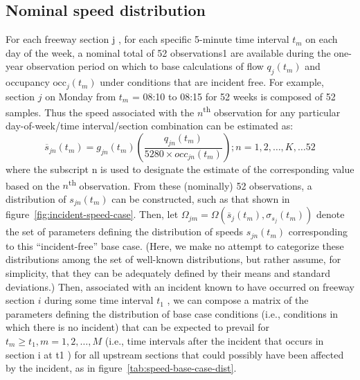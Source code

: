 \documentclass[12pt]{report}
\begin{document}
\subsection{Nominal speed distribution}
\label{sec:nom-speed-dist}
For each freeway section j , for each specific 5-minute time interval $t_m$ on
each day of the week, a nominal total of 52 observations1 are available during
the one-year observation period on which to base calculations of flow $q_j(t_m)$
and occupancy $\mathrm{occ}_j(t_m)$ under conditions that are incident free. For
example, section $j$ on Monday from $t_m$ = 08:10 to 08:15 for 52 weeks is
composed of 52 samples. Thus the speed associated with the
$n$\textsuperscript{th} observation for any particular day-of-week/time
interval/section combination can be estimated as:
\begin{equation}
  \label{eq:nominal-speed-obs}
  \overline{s}_{jn}(t_m) = g_{jn}(t_m)\left(\frac{q_{jn}(t_m)}{5280\times occ_{jn}(t_m)}\right);n=1,2,\ldots,K,\ldots{52}
\end{equation}
where the subscript n is used to designate the estimate of the corresponding
value based on the $n$\textsuperscript{th} observation. From these (nominally)
52 observations, a distribution of $s_{jn}(t_m)$ can be constructed, such as
that shown in figure~\ref{fig:incident-speed-case}.  Then, let $\Omega_{jm} =
\Omega\left(\overline{s}_j(t_m),\sigma_{s_j}(t_m)\right)$ denote the set of
parameters defining the distribution of speeds $s_{jn}(t_m)$ corresponding to
this ``incident-free'' base case. (Here, we make no attempt to categorize these
distributions among the set of well-known distributions, but rather assume, for
simplicity, that they can be adequately defined by their means and standard
deviations.)  Then, associated with an incident known to have occurred on
freeway section $i$ during some time interval $t_1$ , we can compose a matrix of
the parameters defining the distribution of base case conditions (i.e.,
conditions in which there is no incident) that can be expected to prevail for
$t_m \ge t_1, m = 1, 2, \ldots{}, M$ (i.e., time intervals after the incident
that occurs in section i at t1 ) for all upstream sections that could possibly
have been affected by the incident, as in figure~\ref{tab:speed-base-case-dist}.
\end{document}
